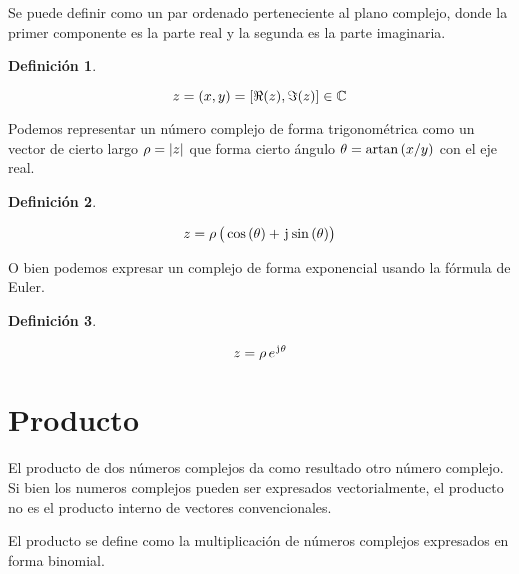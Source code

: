 \documentclass[a5paper,12pt,twoside]{book}
\newtheorem{defn}{{Definición}}[chapter]
\begin{document}
Se puede definir como un par ordenado perteneciente al plano complejo, donde la primer componente es la parte real y la segunda es la parte imaginaria.

\begin{mdframed}[style=DefinitionFrame]
    \begin{defn}
        \label{defn:VectorForm}
    \end{defn}
    \begin{equation*}
        z = (x,y) = \left[\Re(z),\Im(z)\right] \in \mathbb{C}
    \end{equation*}
\end{mdframed}

Podemos representar un número complejo de forma trigonométrica como un vector de cierto largo $\rho={\left| {z} \right|}$ que forma cierto ángulo $\theta = \operatorname{artan}{(x/y)}$ con el eje real.

\begin{mdframed}[style=DefinitionFrame]
    \begin{defn}
        \label{defn:TrigForm}
    \end{defn}
    \begin{equation*}
        z = \rho \, \big( \cos{(\theta)} + \mkern2mu\mathrm{j}\mkern1mu \sin{(\theta)} \big)
    \end{equation*}
\end{mdframed}

O bien podemos expresar un complejo de forma exponencial usando la fórmula de Euler.

\begin{mdframed}[style=DefinitionFrame]
    \begin{defn}
        \label{defn:ExpForm}
    \end{defn}
    \begin{equation*}
        z = \rho \, e^{\mkern2mu\mathrm{j}\mkern1mu \theta}
    \end{equation*}
\end{mdframed}


\section{Producto}

El producto de dos números complejos da como resultado otro número complejo.
Si bien los numeros complejos pueden ser expresados vectorialmente, el producto no es el producto interno de vectores convencionales.

El producto se define como la multiplicación de números complejos expresados en forma binomial.
\end{document}

